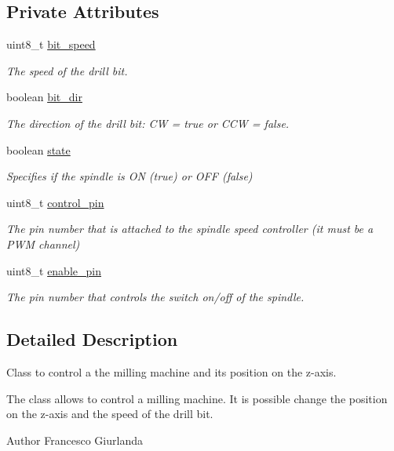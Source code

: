 \subsection*{Private Attributes}
\begin{DoxyCompactItemize}
\item 
uint8\+\_\+t \hyperlink{class_milling_machine_a1980b7b766917656ce78d25c11b3b5c3}{bit\+\_\+speed}
\begin{DoxyCompactList}\small\item\em The speed of the drill bit. \end{DoxyCompactList}\item 
boolean \hyperlink{class_milling_machine_a5ce9e8b53197142881889d113424f3be}{bit\+\_\+dir}
\begin{DoxyCompactList}\small\item\em The direction of the drill bit\+: C\+W = true or C\+C\+W = false. \end{DoxyCompactList}\item 
boolean \hyperlink{class_milling_machine_a8d46b3e3c141e9402a2729b61550babb}{state}
\begin{DoxyCompactList}\small\item\em Specifies if the spindle is O\+N (true) or O\+F\+F (false) \end{DoxyCompactList}\item 
uint8\+\_\+t \hyperlink{class_milling_machine_a6e0a4a728c4063b82d0f726123817d69}{control\+\_\+pin}
\begin{DoxyCompactList}\small\item\em The pin number that is attached to the spindle speed controller (it must be a P\+W\+M channel) \end{DoxyCompactList}\item 
uint8\+\_\+t \hyperlink{class_milling_machine_a129e02eb0a1b612587fd0175a413cfdd}{enable\+\_\+pin}
\begin{DoxyCompactList}\small\item\em The pin number that controls the switch on/off of the spindle. \end{DoxyCompactList}\end{DoxyCompactItemize}


\subsection{Detailed Description}
Class to control a the milling machine and its position on the z-\/axis. 

The class allows to control a milling machine. It is possible change the position on the z-\/axis and the speed of the drill bit. \begin{DoxyAuthor}{Author}
Francesco Giurlanda 
\end{DoxyAuthor}


